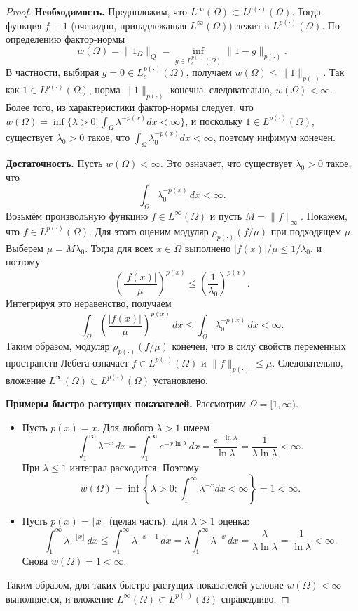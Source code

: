 \documentclass[../NDCNNAI_main.tex]{subfiles}
\begin{document}
\begin{proof}
\textbf{Необходимость.} Предположим, что \( L^\infty(\Omega) \subset L^{p(\cdot)}(\Omega) \). Тогда функция \( f \equiv 1 \) (очевидно, принадлежащая \( L^\infty(\Omega) \)) лежит в \( L^{p(\cdot)}(\Omega) \). По определению фактор-нормы
\[
w(\Omega) = \|1_\Omega\|_Q = \inf_{g \in L_c^{p(\cdot)}(\Omega)} \|1 - g\|_{p(\cdot)}.
\]
В частности, выбирая \( g = 0 \in L_c^{p(\cdot)}(\Omega) \), получаем \( w(\Omega) \leq \|1\|_{p(\cdot)} \). Так как \( 1 \in L^{p(\cdot)}(\Omega) \), норма \( \|1\|_{p(\cdot)} \) конечна, следовательно, \( w(\Omega) < \infty \). Более того, из характеристики фактор-нормы следует, что \( w(\Omega) = \inf\{\lambda > 0\colon \int_\Omega \lambda^{-p(x)} dx < \infty\} \), и поскольку \( 1 \in L^{p(\cdot)}(\Omega) \), существует \( \lambda_0 > 0 \) такое, что \( \int_\Omega \lambda_0^{-p(x)} dx < \infty \), поэтому инфимум конечен.

\textbf{Достаточность.} Пусть \( w(\Omega) < \infty \). Это означает, что существует \( \lambda_0 > 0 \) такое, что
\[
\int_\Omega \lambda_0^{-p(x)} \, dx < \infty.
\]
Возьмём произвольную функцию \( f \in L^\infty(\Omega) \) и пусть \( M = \|f\|_\infty \). Покажем, что \( f \in L^{p(\cdot)}(\Omega) \). Для этого оценим модуляр \( \rho_{p(\cdot)}(f/\mu) \) при подходящем \( \mu \). Выберем \( \mu = M \lambda_0 \). Тогда для всех \( x \in \Omega \) выполнено \( |f(x)|/\mu \leq 1/\lambda_0 \), и поэтому
\[
\left( \frac{|f(x)|}{\mu} \right)^{p(x)} \leq \left( \frac{1}{\lambda_0} \right)^{p(x)}.
\]
Интегрируя это неравенство, получаем
\[
\int_\Omega \left( \frac{|f(x)|}{\mu} \right)^{p(x)} \, dx \leq \int_\Omega \lambda_0^{-p(x)} \, dx < \infty.
\]
Таким образом, модуляр \( \rho_{p(\cdot)}(f/\mu) \) конечен, что в силу свойств переменных пространств Лебега означает \( f \in L^{p(\cdot)}(\Omega) \) и \( \|f\|_{p(\cdot)} \leq \mu \). Следовательно, вложение \( L^\infty(\Omega) \subset L^{p(\cdot)}(\Omega) \) установлено.

\textbf{Примеры быстро растущих показателей.} Рассмотрим \( \Omega = [1, \infty) \).
\begin{itemize}
    \item Пусть \( p(x) = x \). Для любого \( \lambda > 1 \) имеем
    \[
    \int_1^\infty \lambda^{-x} \, dx = \int_1^\infty e^{-x \ln \lambda} \, dx = \frac{e^{-\ln \lambda}}{\ln \lambda} = \frac{1}{\lambda \ln \lambda} < \infty.
    \]
    При \( \lambda \leq 1 \) интеграл расходится. Поэтому 
    \[
    w(\Omega) = \inf\left\{ \lambda > 0 \colon \int_1^\infty \lambda^{-x} dx < \infty \right\} = 1 < \infty.
    \]
    \item Пусть \( p(x) = \lfloor x \rfloor \) (целая часть). Для \( \lambda > 1 \) оценка:
    \[
    \int_1^\infty \lambda^{-\lfloor x \rfloor} \, dx \leq \int_1^\infty \lambda^{-x+1} \, dx = \lambda \int_1^\infty \lambda^{-x} \, dx = \frac{\lambda}{\lambda \ln \lambda} = \frac{1}{\ln \lambda} < \infty.
    \]
    Снова \( w(\Omega) = 1 < \infty \).
\end{itemize}
Таким образом, для таких быстро растущих показателей условие \( w(\Omega) < \infty \) выполняется, и вложение \( L^\infty(\Omega) \subset L^{p(\cdot)}(\Omega) \) справедливо.
\end{proof}
\end{document}

